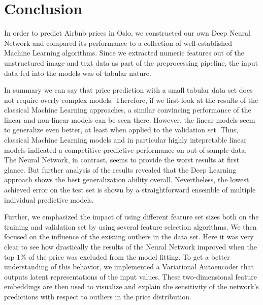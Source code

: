 \section{Conclusion}

In order to predict Airbnb prices in Oslo, we constructed our own Deep Neural Network and compared its performance to a collection of well-established Machine Learning algorithms.
Since we extracted numeric features out of the unstructured image and text data as part of the preprocessing pipeline, the input data fed into the models was of tabular nature.

In summary we can say that price prediction with a small tabular data set does not require overly complex models. Therefore, if we first look at the results of the classical Machine Learning approaches, a similar convincing performance of the linear and non-linear models can be seen there. However, the linear models seem to generalize even better, at least when applied to the validation set. Thus, classical Machine Learning models and in particular highly intepretable linear models indicated a competitive predictive performance on out-of-sample data. 
The Neural Network, in contrast, seems to provide the worst results at first glance. But further analysis of the results revealed that the Deep Learning approach shows the best generalization ability overall. 
Nevertheless, the lowest achieved error on the test set is shown by a straightforward ensemble of multiple individual predictive models. 



Further, we emphasized the impact of using different feature set sizes both on the training and validation set by using several feature selection algorithms.
We then focused on the influence of the existing outliers in the data set. Here it was very clear to see how drastically the results of the Neural Network improved when the top $1\%$ of the price was excluded from the model fitting. To get a better understanding of this behavior, we implemented a Variational Autoencoder that outputs latent representations of the input values. These two-dimensional feature embeddings are then used to visualize and explain the sensitivity of the network's predictions with respect to outliers in the price distribution.

